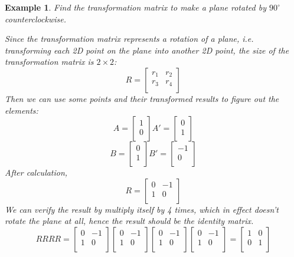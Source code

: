 \documentclass{article}
\newtheorem{example}{Example}
\begin{document}
\begin{example}
  Find the transformation matrix to make a plane rotated by $90^{\circ}$ 
  counterclockwise.

  Since the transformation matrix represents a rotation of a plane, i.e. 
  transforming each 2D point on the plane into another 2D point, the size of 
  the transformation matrix is $2 \times 2$:
  \[
    R = 
    \begin{bmatrix}
      r_1 & r_2 \\
      r_3 & r_4 \\
    \end{bmatrix}
  \]
  Then we can use some points and their transformed results to figure out the 
  elements:
  \[
    A = 
    \begin{bmatrix}
      1 \\
      0 \\
    \end{bmatrix}
    A' = 
    \begin{bmatrix}
      0 \\
      1 \\
    \end{bmatrix}
  \]
  \[
    B =
    \begin{bmatrix}
      0 \\
      1 \\
    \end{bmatrix}
    B' = 
    \begin{bmatrix}
      -1 \\
      0 \\
    \end{bmatrix}
  \]
  After calculation,
  \[
    R = 
    \begin{bmatrix}
      0 & -1 \\
      1 & 0 \\
    \end{bmatrix}
  \]
  We can verify the result by multiply itself by 4 times, which in effect 
  doesn't rotate the plane at all, hence the result should be the identity 
  matrix.
  \[
    RRRR = 
    \begin{bmatrix}
      0 & -1 \\
      1 & 0 \\
    \end{bmatrix}
    \begin{bmatrix}
      0 & -1 \\
      1 & 0 \\
    \end{bmatrix}
    \begin{bmatrix}
      0 & -1 \\
      1 & 0 \\
    \end{bmatrix}
    \begin{bmatrix}
      0 & -1 \\
      1 & 0 \\
    \end{bmatrix} = 
    \begin{bmatrix}
      1 & 0 \\
      0 & 1 \\
    \end{bmatrix}
  \]
\end{example}
\end{document}
